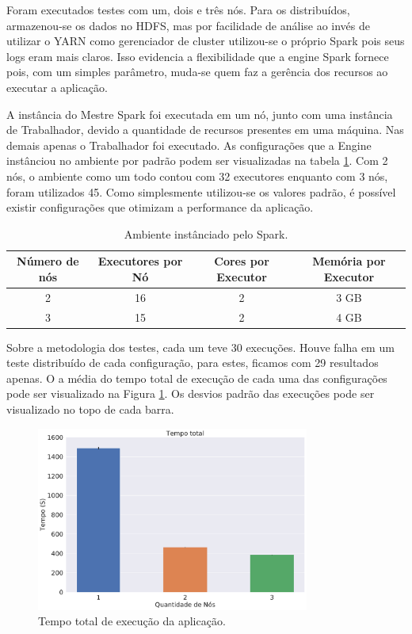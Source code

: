 Foram executados testes com um, dois e três nós. Para os distribuídos, 
armazenou-se os dados no HDFS, mas por facilidade de análise ao invés de 
utilizar o YARN como gerenciador de cluster utilizou-se o próprio Spark pois 
seus logs eram mais claros. Isso evidencia a flexibilidade que a engine Spark 
fornece pois, com um simples parâmetro, muda-se quem faz a gerência dos 
recursos ao executar a aplicação. 

A instância do Mestre Spark foi executada em um nó, junto com uma instância de 
Trabalhador, devido a quantidade de recursos presentes em uma máquina. Nas 
demais apenas o Trabalhador foi executado. As configurações que a Engine 
instânciou no ambiente por padrão podem ser visualizadas na tabela 
\ref{tab:spark_def_config}. Com 2 nós, o ambiente como um todo contou com 32 
executores enquanto com 3 nós, foram utilizados 45. Como simplesmente 
utilizou-se os valores padrão, é possível existir configurações que otimizam a 
performance da aplicação.

\begin{table}[H]
\centering
\begin{tabular}{c c c c} \toprule
\textbf{Número de nós}  &  \textbf{Executores por Nó} & \textbf{Cores por 
Executor} & \textbf{Memória por Executor} \\ 
\midrule
2	& 16 & 2 & 3 GB\\
3	& 15 & 2 & 4 GB\\
\end{tabular}
\caption{Ambiente instânciado pelo Spark.}
\label{tab:spark_def_config}
\end{table}

Sobre a metodologia dos testes, cada um teve 30 execuções. Houve falha em um 
teste distribuído de cada configuração, para estes, ficamos com 29 resultados 
apenas. O a média do tempo total de execução de cada uma das configurações pode 
ser visualizado na Figura \ref{fig:total_full}. Os desvios padrão das execuções 
pode ser visualizado no topo de cada barra. 

\begin{figure}[ht]
\centerline{
\includegraphics[width=0.8\textwidth]{./img/total.pdf}}
 \caption{Tempo total de execução da aplicação.}
 \label{fig:total_full}
\end{figure}





